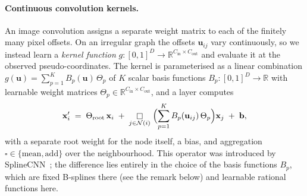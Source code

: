 \documentclass{article} %
\newcommand{\bx}{\mathbf{x}}
\newcommand{\bu}{\mathbf{u}}
\newcommand{\R}{\mathbb{R}}
\newcommand{\Cin}{C_{\mathrm{in}}}
\newcommand{\Cout}{C_{\mathrm{out}}}
\begin{document}
\paragraph{Continuous convolution kernels.}
An image convolution assigns a separate weight matrix to each of the
finitely many pixel offsets. On an irregular graph the offsets $\bu_{ij}$
vary continuously, so we instead learn a \emph{kernel function}
$g:[0,1]^D\to\R^{\Cin\times\Cout}$ and evaluate it at the observed
pseudo-coordinates. The kernel is parameterised as a linear combination
$g(\bu)=\sum_{p=1}^{K}B_p(\bu)\,\Theta_p$ of $K$ scalar basis
functions $B_p\colon[0,1]^D\to\R$ with learnable weight matrices
$\Theta_p\in\R^{\Cin\times\Cout}$, and a layer computes
\begin{equation}
\bx'_i \;=\; \Theta_{\mathrm{root}}\,\bx_i \;+\;
\mathop{\square}_{j\in\mathcal N(i)}\;\Bigl(\sum_{p=1}^{K} B_p(\bu_{ij})\,\Theta_p\Bigr)\bx_j \;+\; \mathbf b,
\label{eq:splineconv}
\end{equation}
with a separate root weight for the node itself, a bias, and aggregation
$\square \in \{\mathrm{mean}, \mathrm{add}\}$ over the neighbourhood.
This operator was introduced by SplineCNN~\citep{fey2018splinecnn}; the
difference lies entirely in the choice of the basis functions $B_p$, which
are fixed B-splines there (see the remark below) and learnable rational
functions here.
\end{document}
